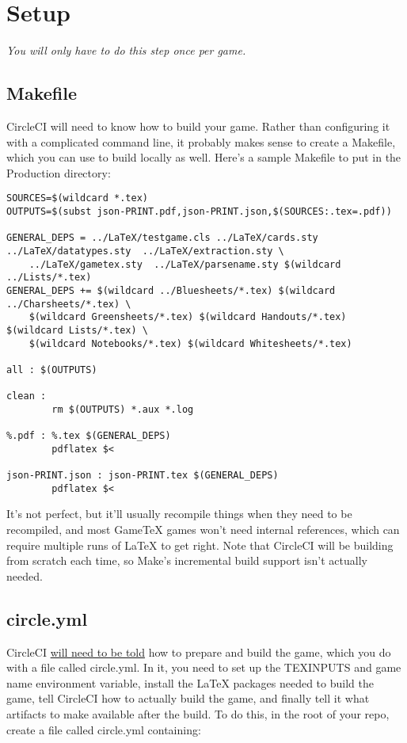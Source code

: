 \documentclass[green]{testgame}
\begin{document}
\section{Setup}

\emph{You will only have to do this step once per game.}

\subsection{Makefile}

CircleCI will need to know how to build your game. Rather than configuring it with a complicated command line, it probably makes sense to create a Makefile, which you can use to build locally as well. Here's a sample Makefile to put in the Production directory:

\begin{verbatim}
SOURCES=$(wildcard *.tex)
OUTPUTS=$(subst json-PRINT.pdf,json-PRINT.json,$(SOURCES:.tex=.pdf))

GENERAL_DEPS = ../LaTeX/testgame.cls ../LaTeX/cards.sty  ../LaTeX/datatypes.sty  ../LaTeX/extraction.sty \
    ../LaTeX/gametex.sty  ../LaTeX/parsename.sty $(wildcard ../Lists/*.tex)
GENERAL_DEPS += $(wildcard ../Bluesheets/*.tex) $(wildcard ../Charsheets/*.tex) \
    $(wildcard Greensheets/*.tex) $(wildcard Handouts/*.tex) $(wildcard Lists/*.tex) \
    $(wildcard Notebooks/*.tex) $(wildcard Whitesheets/*.tex)

all : $(OUTPUTS)

clean :
        rm $(OUTPUTS) *.aux *.log

%.pdf : %.tex $(GENERAL_DEPS)
        pdflatex $<

json-PRINT.json : json-PRINT.tex $(GENERAL_DEPS)
        pdflatex $<
\end{verbatim}

It's not perfect, but it'll usually recompile things when they need to be recompiled, and most GameTeX games won't need internal references, which can require multiple runs of \LaTeX{} to get right. Note that CircleCI will be building from scratch each time, so Make's incremental build support isn't actually needed.

\subsection{circle.yml}

CircleCI \href{https://circleci.com/docs/configuration/}{will need to be told} how to prepare and build the game, which you do with a file called circle.yml. In it, you need to set up the TEXINPUTS and game name environment variable, install the LaTeX packages needed to build the game, tell CircleCI how to actually build the game, and finally tell it what artifacts to make available after the build. To do this, in the root of your repo, create a file called circle.yml containing:
\end{document}
